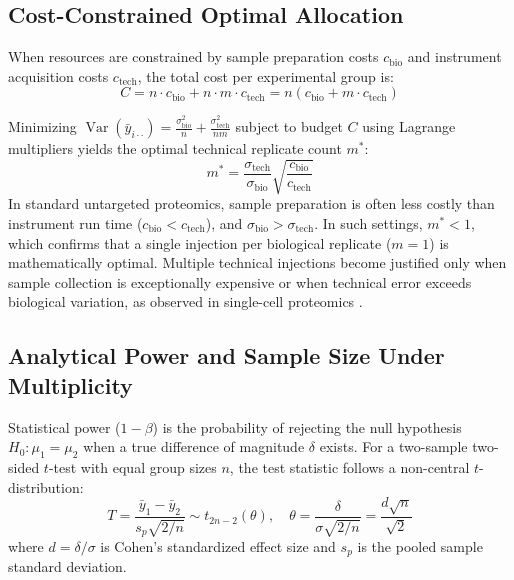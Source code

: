 \documentclass[11pt,twoside,openright]{book}
\begin{document}
\subsection{Cost-Constrained Optimal Allocation}

When resources are constrained by sample preparation costs $c_{\text{bio}}$ and instrument acquisition costs $c_{\text{tech}}$, the total cost per experimental group is:
\begin{equation}
C = n \cdot c_{\text{bio}} + n \cdot m \cdot c_{\text{tech}} = n (c_{\text{bio}} + m \cdot c_{\text{tech}})
\label{eq:cost_constraint}
\end{equation}

Minimizing $\operatorname{Var}(\bar{y}_{i\cdot\cdot}) = \frac{\sigma^2_{\text{bio}}}{n} + \frac{\sigma^2_{\text{tech}}}{n m}$ subject to budget $C$ using Lagrange multipliers yields the optimal technical replicate count $m^*$:
\begin{equation}
m^* = \frac{\sigma_{\text{tech}}}{\sigma_{\text{bio}}} \sqrt{\frac{c_{\text{bio}}}{c_{\text{tech}}}}
\label{eq:optimal_m}
\end{equation}
In standard untargeted proteomics, sample preparation is often less costly than instrument run time ($c_{\text{bio}} < c_{\text{tech}}$), and $\sigma_{\text{bio}} > \sigma_{\text{tech}}$. In such settings, $m^* < 1$, which confirms that a single injection per biological replicate ($m = 1$) is mathematically optimal. Multiple technical injections become justified only when sample collection is exceptionally expensive or when technical error exceeds biological variation, as observed in single-cell proteomics \cite{vanderaa2021scp}.

\subsection{Analytical Power and Sample Size Under Multiplicity}

Statistical power ($1 - \beta$) is the probability of rejecting the null hypothesis $H_0: \mu_1 = \mu_2$ when a true difference of magnitude $\delta$ exists. For a two-sample two-sided $t$-test with equal group sizes $n$, the test statistic follows a non-central $t$-distribution:
\begin{equation}
T = \frac{\bar{y}_1 - \bar{y}_2}{s_p \sqrt{2/n}} \sim t_{2n-2}(\theta), \quad \theta = \frac{\delta}{\sigma \sqrt{2/n}} = \frac{d \sqrt{n}}{\sqrt{2}}
\label{eq:nct}
\end{equation}
where $d = \delta / \sigma$ is Cohen's standardized effect size and $s_p$ is the pooled sample standard deviation.
\end{document}
